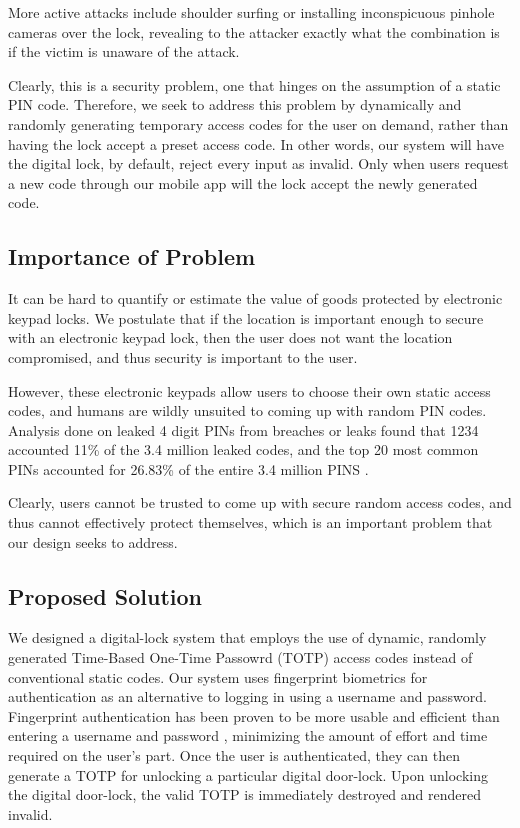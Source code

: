 \documentclass[conference]{IEEEtran}
\begin{document}
More active attacks include shoulder surfing or installing inconspicuous pinhole cameras over the lock, revealing to the attacker exactly what the combination is if the victim is unaware of the attack. 

Clearly, this is a security problem, one that hinges on the assumption of a static PIN code. Therefore, we seek to address this problem by dynamically and randomly generating temporary access codes for the user on demand, rather than having the lock accept a preset access code. In other words, our system will have the digital lock, by default, reject every input as invalid. Only when users request a new code through our mobile app will the lock accept the newly generated code.

\subsection{Importance of Problem}
It can be hard to quantify or estimate the value of goods protected by electronic keypad locks. We postulate that if the location is important enough to secure with an electronic keypad lock, then the user does not want the location compromised, and thus security is important to the user. 

	However, these electronic keypads allow users to choose their own static access codes, and humans are wildly unsuited to coming up with random PIN codes. Analysis done on leaked 4 digit PINs from breaches or leaks found that 1234 accounted 11\% of the 3.4 million leaked codes, and the top 20 most common PINs accounted for 26.83\% of the entire 3.4 million PINS \cite{b1}.
	
	Clearly, users cannot be trusted to come up with secure random access codes, and thus cannot effectively protect themselves, which is an important problem that our design seeks to address.

\subsection{Proposed Solution}
	We designed a digital-lock system that employs the use of dynamic, randomly generated Time-Based One-Time Passowrd (TOTP) access codes instead of conventional static codes. Our system uses fingerprint biometrics for authentication as an alternative to logging in using a username and password. Fingerprint authentication has been proven to be more usable and efficient than entering a username and password \cite{ab2}, minimizing the amount of effort and time required on the user’s part. Once the user is authenticated, they can then generate a TOTP for unlocking a particular digital door-lock. Upon unlocking the digital door-lock, the valid TOTP is immediately destroyed and rendered invalid. 
	
\end{document}
